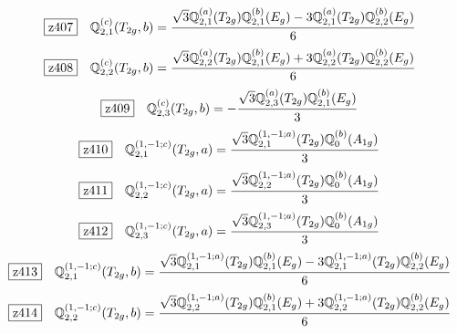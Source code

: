 \documentclass[fleqn,10pt,landscape]{jsarticle}
\begin{document}
\begin{dmath*}
\hspace*{3mm}\fbox{z407}\quad \mathbb{Q}_{2,1}^{(c)}(T_{2g},b)=\frac{\sqrt{3} \mathbb{Q}_{2,1}^{(a)}(T_{2g}) \mathbb{Q}_{2,1}^{(b)}(E_{g}) - 3 \mathbb{Q}_{2,1}^{(a)}(T_{2g}) \mathbb{Q}_{2,2}^{(b)}(E_{g})}{6}
\end{dmath*}
\begin{dmath*}
\hspace*{3mm}\fbox{z408}\quad \mathbb{Q}_{2,2}^{(c)}(T_{2g},b)=\frac{\sqrt{3} \mathbb{Q}_{2,2}^{(a)}(T_{2g}) \mathbb{Q}_{2,1}^{(b)}(E_{g}) + 3 \mathbb{Q}_{2,2}^{(a)}(T_{2g}) \mathbb{Q}_{2,2}^{(b)}(E_{g})}{6}
\end{dmath*}
\begin{dmath*}
\hspace*{3mm}\fbox{z409}\quad \mathbb{Q}_{2,3}^{(c)}(T_{2g},b)=- \frac{\sqrt{3} \mathbb{Q}_{2,3}^{(a)}(T_{2g}) \mathbb{Q}_{2,1}^{(b)}(E_{g})}{3}
\end{dmath*}
\begin{dmath*}
\hspace*{3mm}\fbox{z410}\quad \mathbb{Q}_{2,1}^{(1,-1;c)}(T_{2g},a)=\frac{\sqrt{3} \mathbb{Q}_{2,1}^{(1,-1;a)}(T_{2g}) \mathbb{Q}_{0}^{(b)}(A_{1g})}{3}
\end{dmath*}
\begin{dmath*}
\hspace*{3mm}\fbox{z411}\quad \mathbb{Q}_{2,2}^{(1,-1;c)}(T_{2g},a)=\frac{\sqrt{3} \mathbb{Q}_{2,2}^{(1,-1;a)}(T_{2g}) \mathbb{Q}_{0}^{(b)}(A_{1g})}{3}
\end{dmath*}
\begin{dmath*}
\hspace*{3mm}\fbox{z412}\quad \mathbb{Q}_{2,3}^{(1,-1;c)}(T_{2g},a)=\frac{\sqrt{3} \mathbb{Q}_{2,3}^{(1,-1;a)}(T_{2g}) \mathbb{Q}_{0}^{(b)}(A_{1g})}{3}
\end{dmath*}
\begin{dmath*}
\hspace*{3mm}\fbox{z413}\quad \mathbb{Q}_{2,1}^{(1,-1;c)}(T_{2g},b)=\frac{\sqrt{3} \mathbb{Q}_{2,1}^{(1,-1;a)}(T_{2g}) \mathbb{Q}_{2,1}^{(b)}(E_{g}) - 3 \mathbb{Q}_{2,1}^{(1,-1;a)}(T_{2g}) \mathbb{Q}_{2,2}^{(b)}(E_{g})}{6}
\end{dmath*}
\begin{dmath*}
\hspace*{3mm}\fbox{z414}\quad \mathbb{Q}_{2,2}^{(1,-1;c)}(T_{2g},b)=\frac{\sqrt{3} \mathbb{Q}_{2,2}^{(1,-1;a)}(T_{2g}) \mathbb{Q}_{2,1}^{(b)}(E_{g}) + 3 \mathbb{Q}_{2,2}^{(1,-1;a)}(T_{2g}) \mathbb{Q}_{2,2}^{(b)}(E_{g})}{6}
\end{dmath*}
\end{document}
